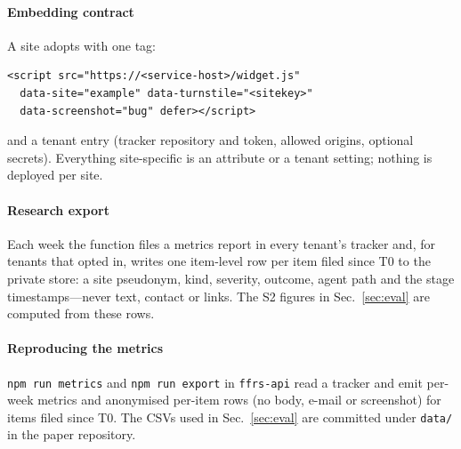 \paragraph{Embedding contract} A site adopts \ffrs{} with one tag:
\begin{lstlisting}
<script src="https://<service-host>/widget.js"
  data-site="example" data-turnstile="<sitekey>"
  data-screenshot="bug" defer></script>
\end{lstlisting}
and a tenant entry (tracker repository and token, allowed origins, optional secrets). Everything site-specific is an attribute or a tenant setting; nothing is deployed per site.

\paragraph{Research export} Each week the function files a metrics report in every tenant's tracker and, for tenants that opted in, writes one item-level row per item filed since T0 to the private store: a site pseudonym, kind, severity, outcome, agent path and the stage timestamps---never text, contact or links. The S2 figures in Sec.~\ref{sec:eval} are computed from these rows.

\paragraph{Reproducing the metrics} \texttt{npm run metrics} and \texttt{npm run export} in \texttt{ffrs-api} read a tracker and emit per-week metrics and anonymised per-item rows (no body, e-mail or screenshot) for items filed since T0. The CSVs used in Sec.~\ref{sec:eval} are committed under \texttt{data/} in the paper repository.

